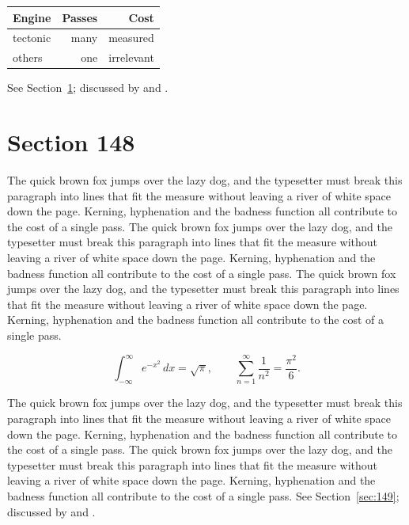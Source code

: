 \documentclass{article}
\begin{document}
\begin{center}
\begin{tabular}{lrr}
\toprule
Engine & Passes & Cost \\
\midrule
tectonic & many & measured \\
others & one & irrelevant \\
\bottomrule
\end{tabular}
\end{center}

See Section~\ref{sec:148}; discussed by \textcite{k3} and \textcite{l5}.
\section{Section 148}
\label{sec:148}
The quick brown fox jumps over the lazy dog, and the typesetter must break this paragraph into lines that fit the measure without leaving a river of white space down the page. Kerning, hyphenation and the badness function all contribute to the cost of a single pass. The quick brown fox jumps over the lazy dog, and the typesetter must break this paragraph into lines that fit the measure without leaving a river of white space down the page. Kerning, hyphenation and the badness function all contribute to the cost of a single pass. The quick brown fox jumps over the lazy dog, and the typesetter must break this paragraph into lines that fit the measure without leaving a river of white space down the page. Kerning, hyphenation and the badness function all contribute to the cost of a single pass. 

\begin{equation}\label{eq:148}
\int_{-\infty}^{\infty} e^{-x^{2}}\,dx = \sqrt{\pi}, \qquad
\sum_{n=1}^{\infty} \frac{1}{n^{2}} = \frac{\pi^{2}}{6}.
\end{equation}

The quick brown fox jumps over the lazy dog, and the typesetter must break this paragraph into lines that fit the measure without leaving a river of white space down the page. Kerning, hyphenation and the badness function all contribute to the cost of a single pass. The quick brown fox jumps over the lazy dog, and the typesetter must break this paragraph into lines that fit the measure without leaving a river of white space down the page. Kerning, hyphenation and the badness function all contribute to the cost of a single pass. 
See Section~\ref{sec:149}; discussed by \textcite{k4} and \textcite{l1}.
\end{document}
